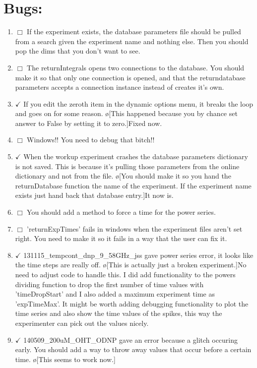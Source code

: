 \documentclass[10pt]{book}
\begin{document}
\section{Bugs:}
\begin{enumerate}
    \item $\Box$ If the experiment exists, the database parameters file should be pulled from a search given the experiment name and nothing else. Then you should pop the dims that you don't want to see.
    \item $\Box$ The returnIntegrals opens two connections to the database. You should make it so that only one connection is opened, and that the returndatabase parameters accepts a connection instance instead of creates it's own.
    \item $\checkmark$ If you edit the zeroth item in the dynamic options menu, it breaks the loop and goes on for some reason. \o[This happened because you by chance set answer to False by setting it to zero.]{Fixed now.}
    \item $\Box$ Windows!! You need to debug that bitch!!
    \item $\checkmark$ When the workup experiment crashes the database parameters dictionary is not saved. This is because it's pulling those parameters from the online dictionary and not from the file. \o[You should make it so you hand the returnDatabase function the name of the experiment. If the experiment name exists just hand back that database entry.]{It now is.}
    \item $\Box$ You should add a method to force a time for the power series.
    \item $\Box$ 'returnExpTimes' fails in windows when the experiment files aren't set right. You need to make it so it fails in a way that the user can fix it.
    \item $\checkmark$ 131115_tempcont_dnp_9_58GHz_jss gave power series error, it looks like the time steps are really off. \o[This is actually just a broken experiment.]{No need to adjust code to handle this. I did add functionality to the powers dividing function to drop the first number of time values with 'timeDropStart' and I also added a maximum experiment time as 'expTimeMax'. It might be worth adding debugging functionality to plot the time series and also show the time values of the spikes, this way the experimenter can pick out the values nicely.}
    \item $\checkmark$ 140509_200uM_OHT_ODNP gave an error because a glitch occuring early. You should add a way to throw away values that occur before a certain time. \o[This seems to work now.]{}

\end{enumerate}
\end{document}
